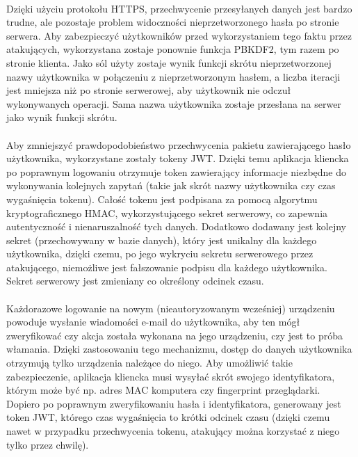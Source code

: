 \documentclass{article}
\begin{document}
    \paragraph{}Dzięki użyciu protokołu HTTPS, przechwycenie przesyłanych danych jest bardzo trudne, ale pozostaje problem widoczności nieprzetworzonego hasła po stronie serwera. Aby zabezpieczyć użytkowników przed wykorzystaniem tego faktu przez atakujących, wykorzystana zostaje ponownie funkcja PBKDF2, tym razem po stronie klienta. Jako sól użyty zostaje wynik funkcji skrótu nieprzetworzonej nazwy użytkownika w połączeniu z nieprzetworzonym hasłem, a liczba iteracji jest mniejsza niż po stronie serwerowej, aby użytkownik nie odczuł wykonywanych operacji. Sama nazwa użytkownika zostaje przesłana na serwer jako wynik funkcji skrótu.

    \paragraph{}Aby zmniejszyć prawdopodobieństwo przechwycenia pakietu zawierającego hasło użytkownika, wykorzystane zostały tokeny JWT. Dzięki temu aplikacja kliencka po poprawnym logowaniu otrzymuje token zawierający informacje niezbędne do wykonywania kolejnych zapytań (takie jak skrót nazwy użytkownika czy czas wygaśnięcia tokenu). Całość tokenu jest podpisana za pomocą algorytmu kryptograficznego HMAC, wykorzystującego sekret serwerowy, co zapewnia autentyczność i nienaruszalność tych danych. Dodatkowo dodawany jest kolejny sekret (przechowywany w bazie danych), który jest unikalny dla każdego użytkownika, dzięki czemu, po jego wykryciu sekretu serwerowego przez atakującego, niemożliwe jest fałszowanie podpisu dla każdego użytkownika. Sekret serwerowy jest zmieniany co określony odcinek czasu.

    \paragraph{}Każdorazowe logowanie na nowym (nieautoryzowanym wcześniej) urządzeniu powoduje wysłanie wiadomości e-mail do użytkownika, aby ten mógł zweryfikować czy akcja została wykonana na jego urządzeniu, czy jest to próba włamania. Dzięki zastosowaniu tego mechanizmu, dostęp do danych użytkownika otrzymują tylko urządzenia należące do niego. Aby umożliwić takie zabezpieczenie, aplikacja kliencka musi wysyłać skrót swojego identyfikatora, którym może być np. adres MAC komputera czy fingerprint przeglądarki. Dopiero po poprawnym zweryfikowaniu hasła i identyfikatora, generowany jest token JWT, którego czas wygaśnięcia to krótki odcinek czasu (dzięki czemu nawet w przypadku przechwycenia tokenu, atakujący można korzystać z niego tylko przez chwilę).
\end{document}
